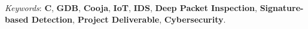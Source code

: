 \documentclass[letterpaper]{twentysecondcv} %
\begin{document}
\begin{twenty}
{            \vspace{1 mm}
            \textit{Keywords}: \textbf{C}, \textbf{GDB}, \textbf{Cooja}, \textbf{IoT}, \textbf{IDS}, \textbf{Deep Packet Inspection}, \textbf{Signature-based Detection}, \textbf{Project Deliverable}, \textbf{Cybersecurity}.
        }
\end{twenty}

\newpage
\makeextrainfo %

\end{document}
